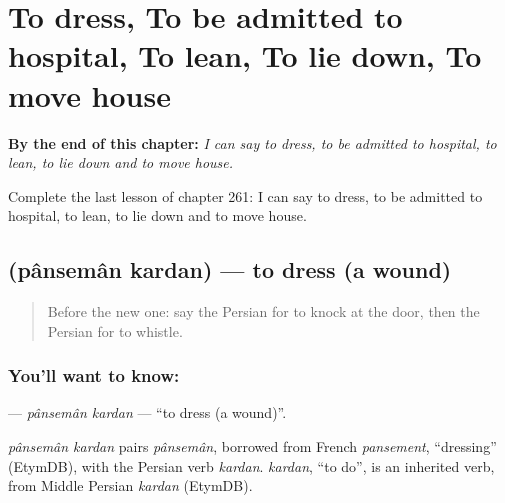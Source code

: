 
\chapter{To dress, To be admitted to hospital, To lean, To lie down, To move house}
\label{ch:fa-to-dress-to-be-admitted-to-hospital-to-lean-to-lie-down-to-move-house}

\begin{chapteropening}
\textbf{By the end of this chapter:} \emph{I can say to dress, to be admitted to hospital, to lean, to lie down and to move house.}

Complete the last lesson of chapter 261: I can say to dress, to be admitted to hospital, to lean, to lie down and to move house.
\end{chapteropening}

\section[\texorpdfstring{\fa{پانسمان} \fa{کردن} (pânsemân kardan)}{پانسمان کردن (pânsemân kardan)}]{  (pânsemân kardan) — to dress (a wound)}

\label{lesson:FA-C261-panseman-kardan}



\begin{quote}
Before the new one: say the Persian for to knock at the door, then the Persian for to whistle.
\end{quote}

\subsection*{You'll want to know:  }
\textbf{ } — \emph{pânsemân kardan} — \textquotedblleft{}to dress (a wound)\textquotedblright{}.

\begin{cousinweb}
\emph{pânsemân kardan} pairs \emph{pânsemân}, borrowed from French \emph{pansement}, \textquotedblleft{}dressing\textquotedblright{} (EtymDB), with the Persian verb \emph{kardan}. \emph{kardan}, \textquotedblleft{}to do\textquotedblright{}, is an inherited verb, from Middle Persian \emph{kardan} (EtymDB).
\end{cousinweb}


